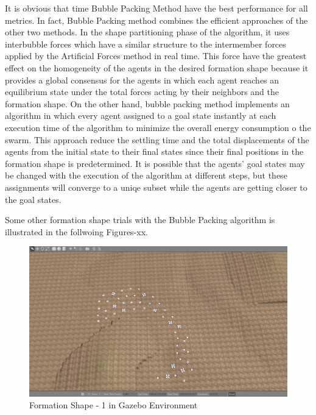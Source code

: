 \documentclass[twoside]{article}
\begin{document}
		It is obvious that time Bubble Packing Method have the best performance for all metrics. In fact, Bubble Packing method combines the efficient approaches of the other two methods. In the shape partitioning phase of the algorithm, it uses interbubble forces which have a similar structure to the intermember forces applied by the Artificial Forces method in real time. This force have the greatest  effect on the homogeneity of the agents in the desired formation shape because it provides a global consensus for the agents in which each agent reaches an equilibrium state under the total forces acting by their neighbors and the formation shape. On the other hand, bubble packing method implements an algorithm in which every agent assigned to a goal state instantly at each execution time of the algorithm to minimize the overall energy consumption o the swarm. This approach reduce the settling time and the total displacements of the agents from the initial state to their final states since their final positions in the formation shape is predetermined. It is possible that the agents' goal states may be changed with the execution of the algorithm at different steps, but these assignments will converge to a uniqe subset while the agents are getting closer to the goal states. 
		
Some other formation shape trials with the Bubble Packing algorithm is illustrated in the follwoing Figures-xx.


		
		 \begin{figure}[H]
		 	\caption{Formation Shape - 1 in Gazebo Environment}
		 	\centerline{\includegraphics[scale = 0.35]{1_Gazebo}}
		 \end{figure} 
			
\end{document}
